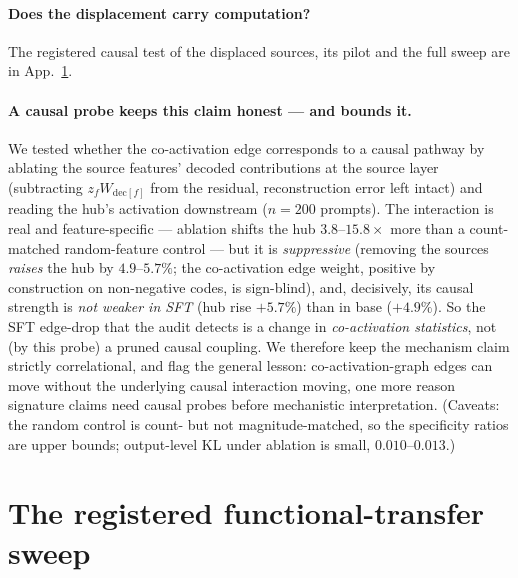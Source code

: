 \documentclass{article}
\begin{document}
\paragraph{Does the displacement carry computation?} The registered causal test of the displaced sources, its pilot and the full sweep are in App.~\ref{app:functional}.

\paragraph{A causal probe keeps this claim honest --- and bounds it.} We tested whether the co-activation edge corresponds to a causal pathway by ablating the source features' decoded contributions at the source layer (subtracting $z_f W_{\text{dec}[f]}$ from the residual, reconstruction error left intact) and reading the hub's activation downstream ($n{=}200$ prompts). The interaction is real and feature-specific --- ablation shifts the hub $3.8$--$15.8\times$ more than a count-matched random-feature control --- but it is \emph{suppressive} (removing the sources \emph{raises} the hub by $4.9$--$5.7\%$; the co-activation edge weight, positive by construction on non-negative codes, is sign-blind), and, decisively, its causal strength is \emph{not weaker in SFT} (hub rise $+5.7\%$) than in base ($+4.9\%$). So the SFT edge-drop that the audit detects is a change in \emph{co-activation statistics}, not (by this probe) a pruned causal coupling. We therefore keep the mechanism claim strictly correlational, and flag the general lesson: co-activation-graph edges can move without the underlying causal interaction moving, one more reason signature claims need causal probes before mechanistic interpretation. (Caveats: the random control is count- but not magnitude-matched, so the specificity ratios are upper bounds; output-level KL under ablation is small, $0.010$--$0.013$.)

\section{The registered functional-transfer sweep}
\label{app:functional}
\end{document}
